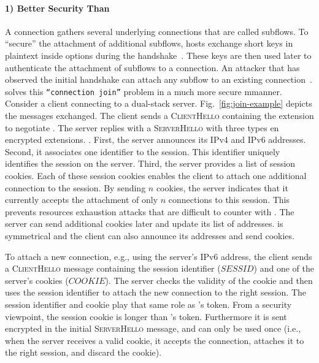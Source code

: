 \paragraph*{1) Better Security Than \mptcp}
A \mptcp connection gathers several underlying connections that are called subflows. To ``secure'' the attachment of additional subflows,
\mptcp hosts exchange short keys in plaintext inside \tcp options during the
\tcp handshake~\cite{rfc6824, rfc8684}. These keys are then used later to
authenticate the attachment of subflows to a connection. An attacker that has
observed the initial handshake can attach any subflow to an existing \mptcp
connection~\cite{rfc6181}.
\tcpls solves this \texttt{``connection join''} problem in a much more secure mmanner. Consider a client connecting to a dual-stack server. Fig.~\ref{fig:join-example} depicts the \tls messages exchanged. The client sends a
\textsc{ClientHello} containing the \tcpls extension to negotiate \tcpls.
The server replies with a \textsc{ServerHello} with three types en encrypted extensions. . First, the server announces its IPv4 and
IPv6 addresses. Second, it associates one identifier to the \tcpls session.
This identifier uniquely identifies the \tcpls session on the server.
Third, the server provides a list of \tcpls session cookies. Each of these session cookies enables
the client to attach one additional \tcp connection to the \tcpls session. By sending $n$ cookies, the server indicates that it currently accepts the attachment of only $n$ \tcp connections to this session. This prevents resources
exhaustion attacks that are difficult to counter with \mptcp.  The server can send additional cookies later and update its list of
addresses. \tcpls is symmetrical and the client can also announce its addresses and send cookies. 

To attach a new connection, e.g., using
the server's IPv6 address, the client sends a \textsc{ClientHello} message containing the session identifier ($SESSID$) and one of the server's cookies ($COOKIE$). The server checks the validity of the cookie and then
uses the session identifier to attach the new
\tcp connection to the right \tcpls session. The session identifier and
cookie play that same role as \mptcp's token. From a security viewpoint,
the session cookie is longer than \mptcp's token. Furthermore it is sent
encrypted in the initial \textsc{ServerHello} message, and can only be used
once (i.e., when the server receives a valid cookie, it accepts the
connection, attaches it to the right \tcpls session, and discard the cookie).

